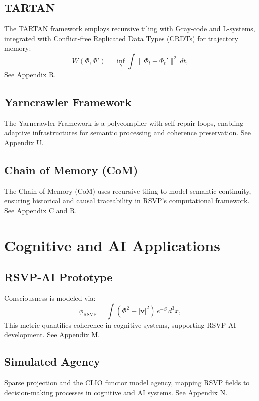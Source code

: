 \documentclass[12pt]{report}
\newcommand{\PhiRSVP}{\Phi}
\newcommand{\vRSVP}{\mathbf{v}}
\newcommand{\SRSVP}{S}
\newcommand{\phirsvp}{\phi_{\text{RSVP}}}
\begin{document}
\chapter{TARTAN}
The TARTAN framework employs recursive tiling with Gray-code and L-systems, integrated with Conflict-free Replicated Data Types (CRDTs) for trajectory memory:
\begin{equation}
W(\PhiRSVP, \PhiRSVP') = \inf_{\gamma} \int \|\PhiRSVP_t - \PhiRSVP_t'\|^2 \, dt, \label{eq:wasserstein}
\end{equation}
See Appendix R.

\chapter{Yarncrawler Framework}
The Yarncrawler Framework is a polycompiler with self-repair loops, enabling adaptive infrastructures for semantic processing and coherence preservation. See Appendix U.

\chapter{Chain of Memory (CoM)}
The Chain of Memory (CoM) uses recursive tiling to model semantic continuity, ensuring historical and causal traceability in RSVP’s computational framework. See Appendix C and R.

\part{Cognitive and AI Applications}

\chapter{RSVP-AI Prototype}
Consciousness is modeled via:
\begin{equation}
\phirsvp = \int (\PhiRSVP^2 + |\vRSVP|^2) \, e^{-\SRSVP} \, d^3x, \label{eq:phirsvp}
\end{equation}
This metric quantifies coherence in cognitive systems, supporting RSVP-AI development. See Appendix M.

\chapter{Simulated Agency}
Sparse projection and the CLIO functor model agency, mapping RSVP fields to decision-making processes in cognitive and AI systems. See Appendix N.
\end{document}
